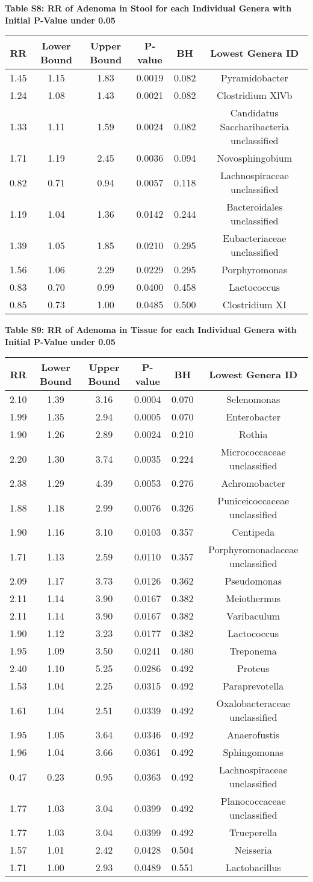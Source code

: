\documentclass[12pt,]{article}
\begin{document}
\newpage

\textbf{Table S8: RR of Adenoma in Stool for each Individual Genera with
Initial P-Value under 0.05}

\begin{longtable}[]{@{}cccccc@{}}
\toprule
RR & Lower Bound & Upper Bound & P-value & BH & Lowest Genera
ID\tabularnewline
\midrule
\endhead
1.45 & 1.15 & 1.83 & 0.0019 & 0.082 & Pyramidobacter\tabularnewline
1.24 & 1.08 & 1.43 & 0.0021 & 0.082 & Clostridium XlVb\tabularnewline
1.33 & 1.11 & 1.59 & 0.0024 & 0.082 & Candidatus Saccharibacteria
unclassified\tabularnewline
1.71 & 1.19 & 2.45 & 0.0036 & 0.094 & Novosphingobium\tabularnewline
0.82 & 0.71 & 0.94 & 0.0057 & 0.118 & Lachnospiraceae
unclassified\tabularnewline
1.19 & 1.04 & 1.36 & 0.0142 & 0.244 & Bacteroidales
unclassified\tabularnewline
1.39 & 1.05 & 1.85 & 0.0210 & 0.295 & Eubacteriaceae
unclassified\tabularnewline
1.56 & 1.06 & 2.29 & 0.0229 & 0.295 & Porphyromonas\tabularnewline
0.83 & 0.70 & 0.99 & 0.0400 & 0.458 & Lactococcus\tabularnewline
0.85 & 0.73 & 1.00 & 0.0485 & 0.500 & Clostridium XI\tabularnewline
\bottomrule
\end{longtable}

\newpage

\textbf{Table S9: RR of Adenoma in Tissue for each Individual Genera
with Initial P-Value under 0.05}

\begin{longtable}[]{@{}cccccc@{}}
\toprule
RR & Lower Bound & Upper Bound & P-value & BH & Lowest Genera
ID\tabularnewline
\midrule
\endhead
2.10 & 1.39 & 3.16 & 0.0004 & 0.070 & Selenomonas\tabularnewline
1.99 & 1.35 & 2.94 & 0.0005 & 0.070 & Enterobacter\tabularnewline
1.90 & 1.26 & 2.89 & 0.0024 & 0.210 & Rothia\tabularnewline
2.20 & 1.30 & 3.74 & 0.0035 & 0.224 & Micrococcaceae
unclassified\tabularnewline
2.38 & 1.29 & 4.39 & 0.0053 & 0.276 & Achromobacter\tabularnewline
1.88 & 1.18 & 2.99 & 0.0076 & 0.326 & Puniceicoccaceae
unclassified\tabularnewline
1.90 & 1.16 & 3.10 & 0.0103 & 0.357 & Centipeda\tabularnewline
1.71 & 1.13 & 2.59 & 0.0110 & 0.357 & Porphyromonadaceae
unclassified\tabularnewline
2.09 & 1.17 & 3.73 & 0.0126 & 0.362 & Pseudomonas\tabularnewline
2.11 & 1.14 & 3.90 & 0.0167 & 0.382 & Meiothermus\tabularnewline
2.11 & 1.14 & 3.90 & 0.0167 & 0.382 & Varibaculum\tabularnewline
1.90 & 1.12 & 3.23 & 0.0177 & 0.382 & Lactococcus\tabularnewline
1.95 & 1.09 & 3.50 & 0.0241 & 0.480 & Treponema\tabularnewline
2.40 & 1.10 & 5.25 & 0.0286 & 0.492 & Proteus\tabularnewline
1.53 & 1.04 & 2.25 & 0.0315 & 0.492 & Paraprevotella\tabularnewline
1.61 & 1.04 & 2.51 & 0.0339 & 0.492 & Oxalobacteraceae
unclassified\tabularnewline
1.95 & 1.05 & 3.64 & 0.0346 & 0.492 & Anaerofustis\tabularnewline
1.96 & 1.04 & 3.66 & 0.0361 & 0.492 & Sphingomonas\tabularnewline
0.47 & 0.23 & 0.95 & 0.0363 & 0.492 & Lachnospiraceae
unclassified\tabularnewline
1.77 & 1.03 & 3.04 & 0.0399 & 0.492 & Planococcaceae
unclassified\tabularnewline
1.77 & 1.03 & 3.04 & 0.0399 & 0.492 & Trueperella\tabularnewline
1.57 & 1.01 & 2.42 & 0.0428 & 0.504 & Neisseria\tabularnewline
1.71 & 1.00 & 2.93 & 0.0489 & 0.551 & Lactobacillus\tabularnewline
\bottomrule
\end{longtable}
\end{document}
